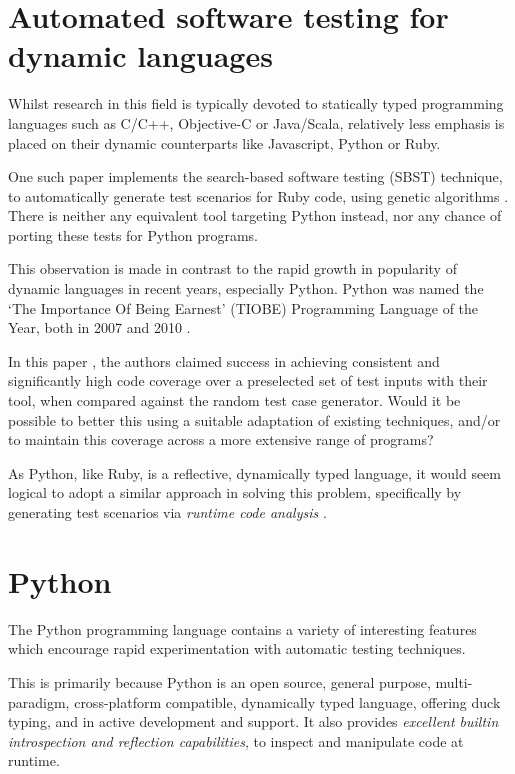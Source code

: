 \section{Automated software testing for dynamic languages}
Whilst research in this field is typically devoted to statically typed programming languages such as C/C++, Objective-C or Java/Scala, relatively less emphasis is placed on their dynamic counterparts like Javascript, Python or Ruby.

One such paper implements the search-based software testing (SBST) technique, to automatically generate test scenarios for Ruby code, using genetic algorithms \cite{Mairhofer2011}. There is neither any equivalent tool targeting Python instead, nor any chance of porting these tests for Python programs.

This observation is made in contrast to the rapid growth in popularity of dynamic languages in recent years, especially Python. Python was named the `The Importance Of Being Earnest' (TIOBE) Programming Language of the Year, both in 2007 and 2010 \cite{TiobeDec11}.

In this paper \cite{Mairhofer2011}, the authors claimed success in achieving consistent and significantly high code coverage over a preselected set of test inputs with their tool, when compared against the \naive random test case generator. Would it be possible to better this using a suitable adaptation of existing techniques, and/or to maintain this coverage across a more extensive range of programs?

As Python, like Ruby, is a reflective, dynamically typed language, it would seem logical to adopt a similar approach in solving this problem, specifically by generating test scenarios via \emph{runtime code analysis} \cite{Mairhofer2011}.
\section{Python}
The Python programming language contains a variety of interesting features which encourage rapid experimentation with automatic testing techniques.

This is primarily because Python is an open source, general purpose, multi-paradigm, cross-platform compatible, dynamically typed language, offering duck typing, and in active development and support. It also provides \emph{excellent builtin introspection and reflection capabilities}, to inspect and manipulate code at runtime.

